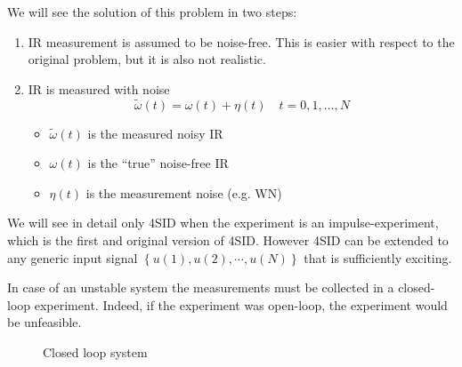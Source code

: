 We will see the solution of this problem in two steps:
\begin{enumerate}
    \item IR measurement is assumed to be noise-free.
    This is easier with respect to the original problem, but it is also not realistic.
    \item IR is measured with noise
    \[ \widetilde{\omega}(t) = \omega(t) + \eta(t) \quad t = 0, 1,\dots, N \]
    \begin{itemize}
        \item $\widetilde{\omega}(t)$ is the measured noisy IR
        \item $\omega(t)$ is the ``true'' noise-free IR
        \item $\eta(t)$ is the measurement noise (e.g. WN)
    \end{itemize}
\end{enumerate}
\begin{remark}
    We will see in detail only 4SID when the experiment is an impulse-experiment, which is the first and original version of 4SID.
    However 4SID can be extended to any generic input signal $\left\{ u(1), u(2), \cdots, u(N) \right\}$ that is sufficiently exciting.
\end{remark}
\begin{remark}
    In case of an unstable system the measurements must be collected in a closed-loop experiment.
    Indeed, if the experiment was open-loop, the experiment would be unfeasible.

    \begin{figure}[H]
        \centering
        \caption*{Closed loop system}
    \end{figure}
\end{remark}

